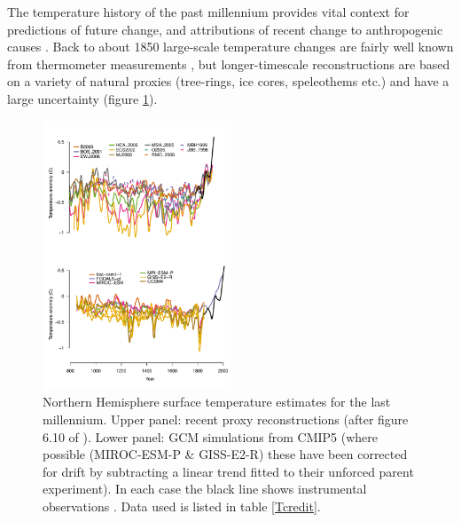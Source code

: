 \documentclass[CP]{copernicus}
\begin{document}
The temperature history of the past millennium provides vital context for predictions of future change, and attributions of recent change to anthropogenic causes \citep{jones04millennia}. Back to about 1850 large-scale temperature changes are fairly well known from thermometer measurements \citep{brohan06hadcrut3}, but longer-timescale reconstructions are based on a variety of natural proxies (tree-rings, ice cores, speleothems etc.) and have a large uncertainty (figure \ref{Fml1}).
\begin{figure}[!hbp]
\begin{center}
\includegraphics[angle=0, width=0.5\textwidth]{../../../analysis/last-millennium/Millennium.pdf}
\caption{Northern Hemisphere surface temperature estimates for the last millennium. Upper panel: recent proxy reconstructions (after figure 6.10 of \citet{jansen07ipcc}). Lower panel: GCM simulations from CMIP5 (where possible (MIROC-ESM-P \& GISS-E2-R) these have been corrected for drift by subtracting a linear trend fitted to their unforced parent experiment). In each case the black line shows instrumental observations \citep{brohan06hadcrut3}. Data used is listed in table \ref{Tcredit}.}
\label{Fml1}
\end{center}
\end{figure}
\end{document}
